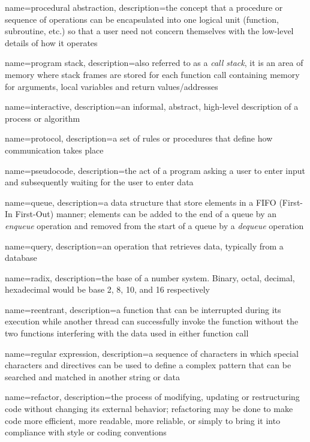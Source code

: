 {
  name=procedural abstraction,
  description={the concept that a procedure or sequence of operations can be encapsulated into one logical unit (function, subroutine, etc.) so that a user need not concern themselves with the low-level details of how it operates}
}

{
  name=program stack,
  description={also referred to as a \emph{call stack}, it is an area of memory where stack frames are stored for each function call containing memory for arguments, local variables and return values/addresses}
}

{
  name=interactive,
  description={an informal, abstract, high-level description of a process or algorithm}
}

{
  name=protocol,
  description={a set of rules or procedures that define how communication takes place}
}

{
  name=pseudocode,
  description={the act of a program asking a user to enter input and subsequently waiting for the user to enter data}
}

{
  name=queue,
  description={a data structure that store elements in a FIFO (First-In First-Out) manner; elements can be added to the end of a queue by an \emph{enqueue} operation and removed from the start of a queue by a \emph{dequeue} operation}
}

{
  name=query,
  description={an operation that retrieves data, typically from a database}
}


{
  name=radix,
  description={the base of a number system.  Binary, octal, decimal, hexadecimal would be base 2, 8, 10, and 16 respectively}
}

{
  name=reentrant,
  description={a function that can be interrupted during its execution while another thread can successfully invoke the function without the two functions interfering with the data used in either function call}
}

{
  name=regular expression,
  description={a sequence of characters in which special characters and directives can be used to define a complex pattern that can be searched and matched in another string or data}
}

{
  name=refactor,
  description={the process of modifying, updating or restructuring code without changing its external behavior; refactoring may be done to make code more efficient, more readable, more reliable, or simply to bring it into compliance with style or coding conventions}
}

